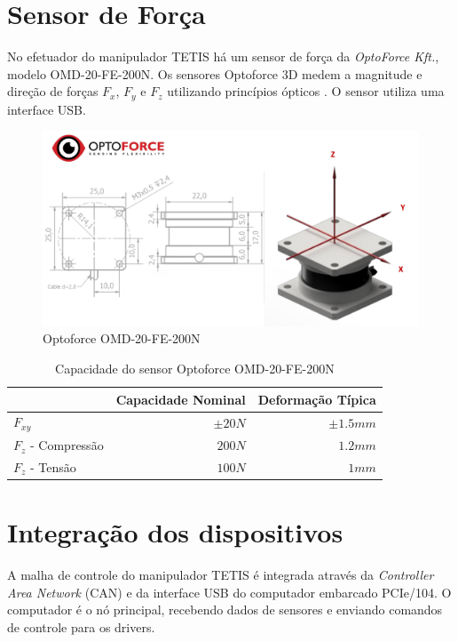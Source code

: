 \section{Sensor de Força} \label{sec:optoforce}

No efetuador do manipulador TETIS há um sensor de força da \textit{OptoForce Kft.}, modelo OMD-20-FE-200N. Os sensores Optoforce 3D medem a magnitude e direção de forças $F_x$, $F_y$ e $F_z$ utilizando princípios ópticos \cite{optoforce}. O sensor utiliza uma interface USB. 

\begin{figure}[!ht]
\centering
  \includegraphics[width=\linewidth]{./img/optoforce.png}
  \caption{Optoforce OMD-20-FE-200N \cite{optoforce}}
  \label{fig:optoforce}
\end{figure}%

\begin{table}[h!]
\centering
\caption{Capacidade do sensor Optoforce OMD-20-FE-200N}
\label{tab:dh_tetis}
\begin{tabular}{lrr} \hline
 &  Capacidade Nominal & Deformação Típica \\ \hline
 $F_{xy}$ & $\pm 20N$ & $\pm 1.5 mm$ \\
 $F_z $ - Compressão & $200N$ & $1.2 mm$ \\
 $F_z $ - Tensão & $100N$ & $1 mm$ \\
\hline
\end{tabular}
\end{table}


\section{Integração dos dispositivos}

A malha de controle do manipulador TETIS é integrada através da \textit{Controller Area Network} (CAN) e da interface USB do computador embarcado PCIe/104. O computador é o nó principal, recebendo dados de sensores e enviando comandos de controle para os drivers.

